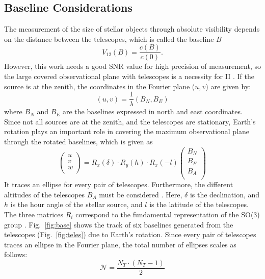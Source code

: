 \subsection{Baseline Considerations}
The measurement of the size of stellar objects through absolute visibility depends on the distance between the telescopes, which is called the baseline $B$
\begin{equation}
	V_{12}(B) = \frac{c(B)}{c(0)}.
	\label{eq:angular_size_meas}
\end{equation}
However, this work needs a good SNR value for high precision of measurement, so the large covered observational plane with telescopes is a necessity for II \citep{acciari2020optical, abeysekara2020demonstration}. If the source is at the zenith, the coordinates in the Fourier plane ($u,v$) are given by:
\begin{equation}
	(u,v) = \frac{1}{\lambda} (B_N, B_E)
\end{equation}
where $B_N$ and $B_E$ are the baselines expressed in north and east coordinates. Since not all sources are at the zenith, and the telescopes are stationary, Earth's rotation plays an important role in covering the maximum observational plane through the rotated baselines, which is given as  
\begin{equation}
	\begin{pmatrix} u\\ v\\ w\\ \end{pmatrix} = R_x(\delta) \cdot R_y(h) \cdot R_x(-l) \begin{pmatrix} B_N\\ B_E\\ B_A\\ \end{pmatrix}
	\label{eq:baseline_rot}
\end{equation}
It traces an ellipse for every pair of telescopes. Furthermore, the different altitudes of the telescopes $B_A$ must be considered \citep{dravins2013optical, saha2020theory}. Here, $\delta$ is the declination, and $h$ is the hour angle of the stellar source, and $l$ is the latitude of the telescopes. The three matrices $R_i$ correspond to the fundamental representation of the SO(3) group \citep{saha2020theory}. Fig.~\ref{fig:base} shows the track of six baselines generated from the telescopes (Fig.~\ref{fig:teles}) due to Earth's rotation. Since every pair of telescopes traces an ellipse in the Fourier plane, the total number of ellipses scales as follows:
\begin{equation}
	\label{eq:N_telescopes}
	\mathcal{N} = \frac{N_T \cdot (N_T -1)}{2}
\end{equation}

